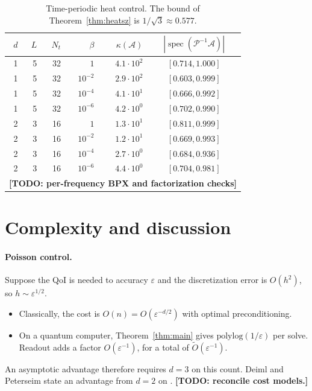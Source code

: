 \documentclass[11pt,a4paper]{article}
\newcommand{\A}{\mathcal{A}}
\newcommand{\todo}[1]{\textbf{[TODO: #1]}}
\theoremstyle{remark}
\begin{document}
\begin{table}[ht]
\centering\small
\begin{tabular}{rrrrrc}
\toprule
$d$ & $L$ & $N_t$ & $\beta$ & $\kappa(\A)$ & $|\operatorname{spec}(\mathcal P^{-1}\A)|$\\
\midrule
1 & 5 & 32 & $1$       & $4.1\cdot10^2$ & $[0.714,1.000]$\\
1 & 5 & 32 & $10^{-2}$ & $2.9\cdot10^2$ & $[0.603,0.999]$\\
1 & 5 & 32 & $10^{-4}$ & $4.1\cdot10^1$ & $[0.666,0.992]$\\
1 & 5 & 32 & $10^{-6}$ & $4.2\cdot10^0$ & $[0.702,0.990]$\\
\midrule
2 & 3 & 16 & $1$       & $1.3\cdot10^1$ & $[0.811,0.999]$\\
2 & 3 & 16 & $10^{-2}$ & $1.2\cdot10^1$ & $[0.669,0.993]$\\
2 & 3 & 16 & $10^{-4}$ & $2.7\cdot10^0$ & $[0.684,0.936]$\\
2 & 3 & 16 & $10^{-6}$ & $4.4\cdot10^0$ & $[0.704,0.981]$\\
\midrule
\multicolumn{6}{l}{\todo{per-frequency BPX and factorization checks}}\\
\bottomrule
\end{tabular}
\caption{Time-periodic heat control. The bound of Theorem~\ref{thm:heatsz} is
$1/\sqrt3\approx0.577$.}
\label{tab:heat}
\end{table}

\section{Complexity and discussion}\label{sec:discussion}

\paragraph{Poisson control.} Suppose the QoI is needed to accuracy $\varepsilon$
and the discretization error is $O(h^2)$, so $h\sim\varepsilon^{1/2}$.
\begin{itemize}
\item Classically, the cost is $O(n)=O(\varepsilon^{-d/2})$ with optimal preconditioning.
\item On a quantum computer, Theorem~\ref{thm:main} gives $\mathrm{polylog}(1/\varepsilon)$
  per solve. Readout adds a factor $O(\varepsilon^{-1})$, for a total of
  $\widetilde O(\varepsilon^{-1})$.
\end{itemize}
An asymptotic advantage therefore requires $d=3$ on this count. Deiml and
Peterseim state an advantage from $d=2$ on \cite{DP24}. \todo{reconcile
cost models.}
\end{document}
